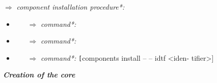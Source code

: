 \documentclass[twocolumn]{article}
\begin{document}
\qquad\textrangle  \hfill\break 
$\Rightarrow $ \quad \textit{component installation procedure*:}





\begin{itemize}
\item{} 
    \begin{itemize}
\item[$\Rightarrow $]\textit {command*:} \hfill{}
\end{itemize}   
\end{itemize}   


\begin{itemize}
\item{} 
    \begin{itemize}
\item[$\Rightarrow $]\textit {command*:} \hfill{}
\end{itemize}   
\end{itemize}   

\begin{itemize}
\item{} 
    \begin{itemize}
\item[$\Rightarrow $]\textit {command*:} \hfill\break 
\texttt [components install --  -- idtf <iden- \break
tifier>]
\end{itemize}   
\end{itemize}   

\qquad\textrangle  \hfill\break 



\textit\textbf{Creation of the core}
\end{document}
